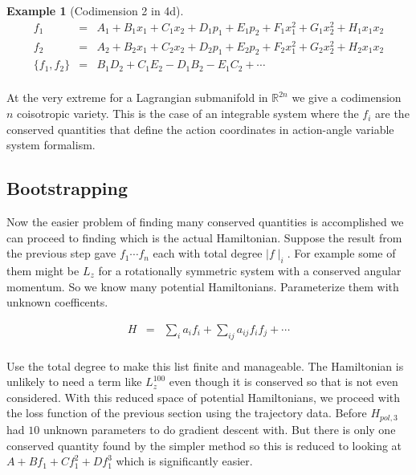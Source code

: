 \documentclass[a4paper,landscape]{article}
\theoremstyle{change}
\newtheorem{example}[equation]{Example}
\theoremstyle{nonumberplain}
\numberwithin{equation}{section}
\newcommand\setof[1]{\{ #1 \}}
\newcommand\abs[1]{ \mid #1 \mid }
\begin{document}
\begin{example}[Codimension 2 in 4d]

\begin{eqnarray*}
f_1 &=& A_1 + B_1 x_1 + C_1 x_2 + D_1 p_1 + E_1 p_2 + F_1 x_1^2 + G_1 x_2^2 + H_1 x_1 x_2\\
f_2 &=& A_2 + B_2 x_1 + C_2 x_2 + D_2 p_1 + E_2 p_2 + F_2 x_1^2 + G_2 x_2^2 + H_2 x_1 x_2\\
\setof{ f_1 , f_2 } &=& B_1 D_2 + C_1 E_2 - D_1 B_2 - E_1 C_2 + \cdots\\
\end{eqnarray*}

\end{example}

At the very extreme for a Lagrangian submanifold in $\mathbb{R}^{2n}$ we give a codimension $n$ coisotropic variety. This is the case of an integrable system where the $f_i$ are the conserved quantities that define the action coordinates in action-angle variable system formalism.

\subsection{Bootstrapping}

Now the easier problem of finding many conserved quantities is accomplished we can proceed to finding which is the actual Hamiltonian. Suppose the result from the previous step gave $f_1 \cdots f_n$ each with total degree $\abs{f}_i$. For example some of them might be $L_z$ for a rotationally symmetric system with a conserved angular momentum. So we know many potential Hamiltonians. Parameterize them with unknown coefficents.

\begin{eqnarray*}
H &=& \sum_i a_i f_i + \sum_{ij} a_{ij} f_i f_j + \cdots\\
\end{eqnarray*}

Use the total degree to make this list finite and manageable. The Hamiltonian is unlikely to need a term like $L_z^{100}$ even though it is conserved so that is not even considered. With this reduced space of potential Hamiltonians, we proceed with the loss function of the previous section using the trajectory data. Before $H_{pol,3}$ had $10$ unknown parameters to do gradient descent with. But there is only one conserved quantity found by the simpler method so this is reduced to looking at $A + B f_1 + C f_1^2 + D f_1^3$ which is significantly easier.
\end{document}
